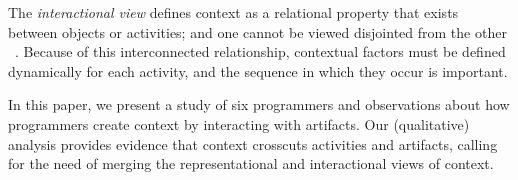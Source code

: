 The \textit{interactional view} defines context as a relational property that exists between objects or activities; and one cannot be viewed disjointed from the other ~\cite{Dourish:2004}. Because of this interconnected relationship, contextual factors must be defined dynamically for each activity, and the sequence in which they occur is important.

In this paper, we present a study of six programmers and observations about how programmers create context by interacting with artifacts. Our (qualitative) analysis provides evidence that context crosscuts activities and artifacts, calling for the need of merging the representational and interactional views of context.



